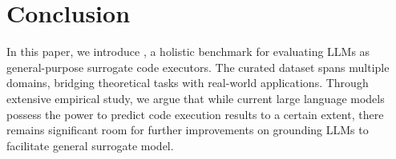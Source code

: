 \section{Conclusion}

In this paper, we introduce \bench, a holistic benchmark for evaluating LLMs as general-purpose surrogate code executors. The curated dataset spans multiple domains, bridging theoretical tasks with real-world applications. Through extensive empirical study, we argue that while current large language models possess the power to predict code execution results to a certain extent, there remains significant room for further improvements on grounding LLMs to facilitate general surrogate model. 